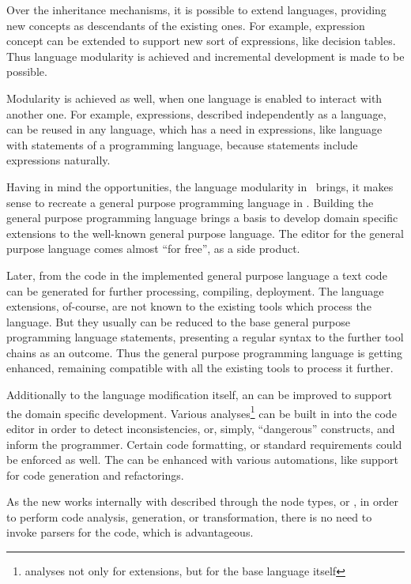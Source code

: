 Over the inheritance mechanisms, it is possible to extend languages, providing new concepts as descendants of 
the existing ones. For example, expression concept can be extended to support new sort of expressions, like decision tables.
Thus language modularity is achieved and incremental development is made to be possible.

Modularity is achieved as well, when one language is enabled to interact with another one. For example, expressions,
described independently as a language, can be reused in any language, which has a need in expressions, like language with
statements of a programming language, because statements include expressions naturally.

Having in mind the opportunities, the language modularity in \jbmps\ brings, it makes sense to recreate a general 
purpose programming language in \jbmps. Building the general purpose programming language brings a basis to develop 
domain specific extensions to the well-known general purpose language. The editor for the general purpose language comes 
almost ``for free'', as a side product. 

Later, from the code in the implemented general purpose language a text code can be generated for further processing, 
compiling, deployment. The language extensions, of-course, are not known to the existing tools which process the language.
But they usually can be reduced to the base general purpose programming language statements, presenting a regular 
syntax to the further tool chains as an outcome. Thus the general purpose programming language is getting enhanced,
remaining compatible with all the existing tools to process it further.

Additionally to the language modification itself, an  can be improved to support the domain specific 
development. Various analyses\footnote{analyses not only for extensions, but for the base language itself} 
can be built in into the code editor in order to detect inconsistencies, or, simply, ``dangerous'' constructs, 
and inform the programmer. Certain code formatting, or standard requirements could be enforced as well. 
The  can be enhanced with various automations, like support for code generation and refactorings. 

As the new  works internally with  described through the node types, or , in order to perform code
analysis, generation, or transformation, there is no need to invoke parsers for the code, which is advantageous.


